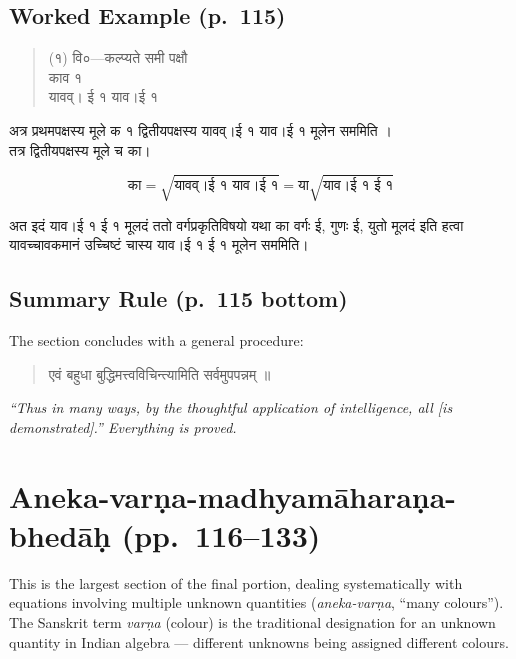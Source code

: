 \documentclass[11pt,a4paper]{article}
\newcommand{\cnote}[1]{\textcolor{notecolor}{\textit{#1}}}
\newcommand{\dev}[1]{{\devanagarifont #1}}
\newenvironment{sanskritverse}{%
  \begin{verse}
}{%
  \end{verse}
}
\begin{document}
\subsection*{Worked Example (p.\ 115)}

\begin{sanskritverse}
\dev{%
(१) वि०—कल्प्यते समी पक्षौ\\[0.3em]
\hspace*{2em} काव १\\
\hspace*{2em} यावव्। ई १ याव।ई १}
\end{sanskritverse}

\dev{%
अत्र प्रथमपक्षस्य मूले क १ द्वितीयपक्षस्य यावव्।ई १ याव।ई १ मूलेन सममिति ।\\
तत्र द्वितीयपक्षस्य मूले च का।}

$$\text{का} = \sqrt{\text{यावव्।ई १ याव।ई १}} = \text{या}\sqrt{\text{याव।ई १ ई १}}$$

\dev{%
अत इदं याव।ई १ ई १ मूलदं ततो वर्गप्रकृतिविषयो यथा का वर्गः ई, गुणः ई, युतो मूलदं इति हत्वा यावच्चावकमानं उच्चिष्टं चास्य याव।ई १ ई १ मूलेन सममिति।}

\subsection*{Summary Rule (p.\ 115 bottom)}

The section concludes with a general procedure:

\begin{sanskritverse}
\dev{%
एवं बहुधा बुद्धिमत्त्वविचिन्त्यामिति सर्वमुपपन्नम् ॥}
\end{sanskritverse}

\cnote{``Thus in many ways, by the thoughtful application of intelligence, all [is demonstrated].'' Everything is proved.}

\section{Aneka-varṇa-madhyamāharaṇa-bhedāḥ (pp.\ 116--133)}
\label{sec:aneka-varna}

This is the largest section of the final portion, dealing systematically with equations involving multiple unknown quantities (\textit{aneka-varṇa}, ``many colours''). The Sanskrit term \textit{varṇa} (colour) is the traditional designation for an unknown quantity in Indian algebra --- different unknowns being assigned different colours.
\end{document}
